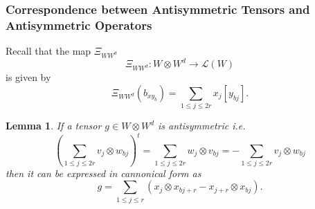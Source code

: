 \documentclass[aps,preprint]{revtex4}
\newtheorem{lemma}[theorem]{Lemma}
\begin{document}
\subsubsection{Correspondence between Antisymmetric Tensors and
Antisymmetric Operators}

Recall that the map $\Xi _{WW^{d}}$ 
\begin{equation}
\Xi _{WW^{d}}:W\otimes W^{d}\rightarrow \mathcal{L}\left( W\right)
\end{equation}%
is given by 
\begin{equation}
\Xi _{WW^{d}}\left( b_{xy_{b}}\right) =\sum_{1\leq j\leq 2r}x_{j}\left[
y_{bj}\right] .
\end{equation}

\begin{lemma}
If a tensor $g\in W\otimes W^{d}$ is antisymmetric i.e. 
\begin{equation}
\left( \sum_{1\leq j\leq 2r}v_{j}\otimes w_{bj}\right) ^{t}=\sum_{1\leq
j\leq 2r}w_{j}\otimes v_{bj}=-\sum_{1\leq j\leq 2r}v_{j}\otimes w_{bj}
\end{equation}%
then it can be expressed in cannonical form as 
\begin{equation}
g=\sum_{1\leq j\leq r}\left( \overset{}{x_{j}\otimes x_{bj+r}-x_{j+r}\otimes
x_{bj}}\right) .
\end{equation}
\end{lemma}
\end{document}
